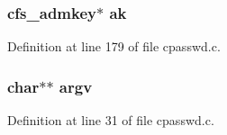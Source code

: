 \subsubsection{\setlength{\rightskip}{0pt plus 5cm}cfs\_\-admkey$\ast$ {\bf ak}}\label{cpasswd_8c_a1}




Definition at line 179 of file cpasswd.c.
\subsubsection{\setlength{\rightskip}{0pt plus 5cm}char$\ast$$\ast$ {\bf argv}}\label{cpasswd_8c_a0}




Definition at line 31 of file cpasswd.c.